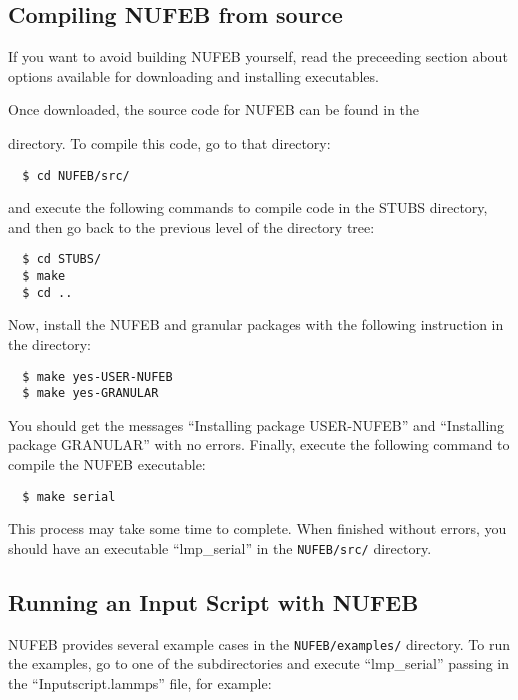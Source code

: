 \documentclass[11pt,a4paper,openright]{article}
\begin{document}
\subsection{Compiling NUFEB from source}
If you want to avoid building NUFEB yourself, read the preceeding section about options available for downloading and installing executables.

Once downloaded, the source code for NUFEB can be found in the 

 directory.  To compile this code, go to that directory:

\begin{verbatim}
  $ cd NUFEB/src/
\end{verbatim}

\noindent
and execute the following commands to compile code in the STUBS directory, and then go back to the previous level of the directory tree:

\begin{verbatim}
  $ cd STUBS/
  $ make
  $ cd ..
\end{verbatim}

\noindent
Now, install the NUFEB and granular packages with the following instruction in the  directory:

\begin{verbatim}
  $ make yes-USER-NUFEB
  $ make yes-GRANULAR
\end{verbatim}

\noindent
You should get the messages ``Installing package USER-NUFEB'' and ``Installing package GRANULAR'' with no errors.  Finally, execute the following command to compile the NUFEB executable:

\begin{verbatim}
  $ make serial
\end{verbatim}

\noindent
This process may take some time to complete.  When finished without errors, you should have an executable ``lmp\_serial'' in the {\tt NUFEB/src/} directory.

\subsection{Running an Input Script with NUFEB}

NUFEB provides several example cases in the {\tt NUFEB/examples/} directory. To run the examples, go to one of the subdirectories and execute ``lmp\_serial'' passing in the ``Inputscript.lammps'' file, for example:
\end{document}
